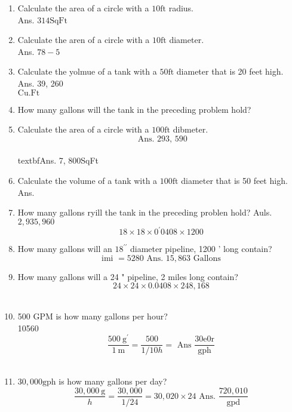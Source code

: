 \begin{enumerate}
\item Calculate the area of a circle with a $10 \mathrm{ft}$ radius.\\
Ans. $314 \mathrm{Sq} \mathrm{Ft}$\\
\item Calculate the aren of a circle with a $10 \mathrm{ft}$ diameter.\\
Ans. $78-5$\\
\item Calculate the yolmue of a tank with a $50 \mathrm{ft}$ diameter that is 20 feet high.\\
Ans. 39, 260\\
$\mathrm{Cu} . \mathrm{Ft}$\\
\item How many gallons will the tank in the preceding problem hold?\\
\item Calculate the area of a circle with a $100 \mathrm{ft}$ dibmeter.\\
$$
\text { Ans. 293, } 590
$$
\\textbf{Ans. 7, 800SqFt}\\
\item Calculate the volume of a tank with a $100 \mathrm{ft}$ diameter that is 50 feet high. Ans.\\
\item How many gallons ryill the tank in the preceding problen hold? Auls.\\
$2,935,960$\\
$$
18 \times 18 \times 0^{\prime} 0408 \times 1200
$$
\item How many gallons will an $18^{\prime \prime}$ diameter pipeline, 1200 ' long contain?\\
$$
\text { imi }=5280 \text { Ans. } 15,863 \text { Gallons }
$$
\item How many gallons will a 24 " pipeline, 2 miles long contain?\\
$$
24 \times 24 \times 0.0408 \times 248,168
$$\\
\item 500 GPM is how many gallons per hour?\\
10560\\
$$
\frac{500 \mathrm{~g}^{\prime}}{1 \mathrm{~m}}=\frac{500}{1 / 10 h}=\text { Ans } \frac{30 \mathrm{e} 0 \mathrm{r}}{\mathrm{gph}}
$$\\
\item $30,000 \mathrm{gph}$ is how many gallons per day?\\
$$
\frac{30,000 \mathrm{~g}}{h}=\frac{30,000}{1 / 24}=30,020 \times 24 \text { Ans. } \frac{720,010}{\mathrm{gpd}}
$$
\end{enumerate}
